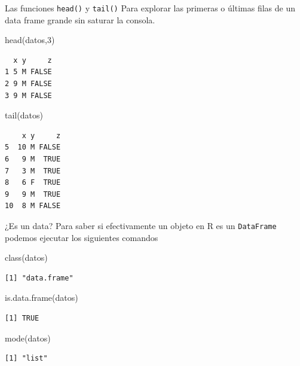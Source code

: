 \documentclass[
  ignorenonframetext,
  aspectratio=169,
  spanish,
]{beamer}
\newenvironment{Shaded}{\begin{snugshade}}{\end{snugshade}}
\newcommand{\DecValTok}[1]{\textcolor[rgb]{0.68,0.00,0.00}{#1}}
\newcommand{\FunctionTok}[1]{\textcolor[rgb]{0.28,0.35,0.67}{#1}}
\newcommand{\NormalTok}[1]{\textcolor[rgb]{0.00,0.23,0.31}{#1}}
\begin{document}
\begin{frame}[fragile]{Las funciones \texttt{head()} y \texttt{tail()}}
\label{las-funciones-head-y-tail}
Para explorar las primeras o últimas filas de un data frame grande sin
saturar la consola.

\begin{Shaded}
\begin{Highlighting}[]
\FunctionTok{head}\NormalTok{(datos,}\DecValTok{3}\NormalTok{)}
\end{Highlighting}
\end{Shaded}

\begin{verbatim}
  x y     z
1 5 M FALSE
2 9 M FALSE
3 9 M FALSE
\end{verbatim}

\begin{Shaded}
\begin{Highlighting}[]
\FunctionTok{tail}\NormalTok{(datos)}
\end{Highlighting}
\end{Shaded}

\begin{verbatim}
    x y     z
5  10 M FALSE
6   9 M  TRUE
7   3 M  TRUE
8   6 F  TRUE
9   9 M  TRUE
10  8 M FALSE
\end{verbatim}
\end{frame}

\begin{frame}[fragile]{¿Es un data?}
\label{es-un-data}
Para saber si efectivamente un objeto en R es un \texttt{DataFrame}
podemos ejecutar los siguientes comandos

\begin{Shaded}
\begin{Highlighting}[]
\FunctionTok{class}\NormalTok{(datos) }
\end{Highlighting}
\end{Shaded}

\begin{verbatim}
[1] "data.frame"
\end{verbatim}

\begin{Shaded}
\begin{Highlighting}[]
\FunctionTok{is.data.frame}\NormalTok{(datos) }
\end{Highlighting}
\end{Shaded}

\begin{verbatim}
[1] TRUE
\end{verbatim}

\begin{Shaded}
\begin{Highlighting}[]
\FunctionTok{mode}\NormalTok{(datos) }
\end{Highlighting}
\end{Shaded}

\begin{verbatim}
[1] "list"
\end{verbatim}
\end{frame}
\end{document}
